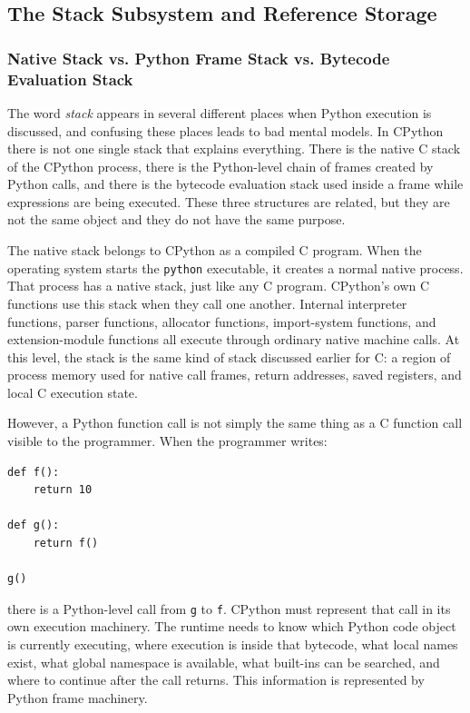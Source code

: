 \subsection{The Stack Subsystem and Reference Storage}


\subsubsection{Native Stack vs. Python Frame Stack vs. Bytecode Evaluation Stack}

The word \emph{stack} appears in several different places when Python execution is discussed, and confusing these places leads to bad mental models. In CPython there is not one single stack that explains everything. There is the native C stack of the CPython process, there is the Python-level chain of frames created by Python calls, and there is the bytecode evaluation stack used inside a frame while expressions are being executed. These three structures are related, but they are not the same object and they do not have the same purpose.

The native stack belongs to CPython as a compiled C program. When the operating system starts the \texttt{python} executable, it creates a normal native process. That process has a native stack, just like any C program. CPython's own C functions use this stack when they call one another. Internal interpreter functions, parser functions, allocator functions, import-system functions, and extension-module functions all execute through ordinary native machine calls. At this level, the stack is the same kind of stack discussed earlier for C: a region of process memory used for native call frames, return addresses, saved registers, and local C execution state.

However, a Python function call is not simply the same thing as a C function call visible to the programmer. When the programmer writes:

\begin{verbatim}
def f():
    return 10

def g():
    return f()

g()
\end{verbatim}

there is a Python-level call from \texttt{g} to \texttt{f}. CPython must represent that call in its own execution machinery. The runtime needs to know which Python code object is currently executing, where execution is inside that bytecode, what local names exist, what global namespace is available, what built-ins can be searched, and where to continue after the call returns. This information is represented by Python frame machinery.

